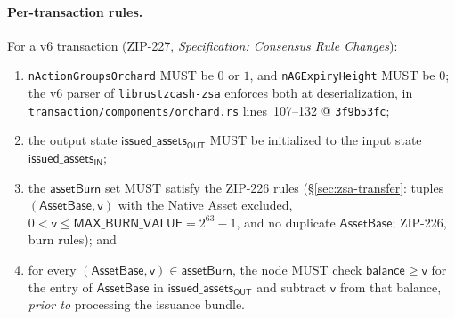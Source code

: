 \documentclass[11pt,a4paper]{article}
\theoremstyle{definition}
\begin{document}
\paragraph{Per-transaction rules.} For a v6 transaction (ZIP-227,
\emph{Specification: Consensus Rule Changes}):
\begin{enumerate}[label=(T\arabic*)]
\item \texttt{nActionGroupsOrchard} MUST be $0$ or $1$, and
  \texttt{nAGExpiryHeight} MUST be $0$; the v6 parser of
  \texttt{librustzcash-zsa} enforces both at deserialization, in
  \texttt{transaction/components/\allowbreak orchard.rs}
  lines~107--132 @ \texttt{3f9b53fc};
\item the output state $\mathsf{issued\_assets_{OUT}}$ MUST be
  initialized to the input state $\mathsf{issued\_assets_{IN}}$;
\item the $\mathsf{assetBurn}$ set MUST satisfy the ZIP-226 rules
  (\S\ref{sec:zsa-transfer}: tuples $(\mathsf{AssetBase}, \mathsf{v})$
  with the Native Asset excluded, $0 < \mathsf{v} \le
  \mathsf{MAX\_BURN\_VALUE} = 2^{63}-1$, and no duplicate
  $\mathsf{AssetBase}$; ZIP-226, burn rules); and
\item for every $(\mathsf{AssetBase}, \mathsf{v}) \in
  \mathsf{assetBurn}$, the node MUST check $\mathsf{balance} \ge
  \mathsf{v}$ for the entry of $\mathsf{AssetBase}$ in
  $\mathsf{issued\_assets_{OUT}}$ and subtract $\mathsf{v}$ from that
  balance, \emph{prior to} processing the issuance bundle.
\end{enumerate}
\end{document}
